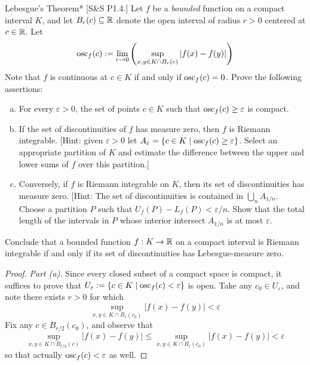 \begin{problem}{Lebesgue's Theorem}*
    [S\&S P1.4.] Let \(f\) be a \emph{bounded} function on a compact interval \(K\), and let \(B_r(c) \subseteq \mathbb{R}\) denote the open interval of radius \(r > 0\) centered at \(c \in \mathbb{R}\). Let 
    \[
        \operatorname{osc}_f(c) := \lim_{r \to 0} \left( \sup_{x, y \in K \cap B_r(c)}|f(x) - f(y)| \right)
    \]
    Note that \(f\) is continuous at \(c \in K\) if and only if \(\operatorname{osc}_f(c) = 0\). Prove the following assertions:
    \begin{enumerate}[(a)]
        \itemsep0em
        \item For every \(\varepsilon > 0\), the set of points \(c \in K\) such that \(\operatorname{osc}_f(c) \geq \varepsilon\) is compact. 
        \item If the set of discontinuities of \(f\) has measure zero, then \(f\) is Riemann integrable. [Hint: given \(\varepsilon > 0\) let \(A_\varepsilon = \{c \in K \mid \operatorname{osc}_f(c) \geq \varepsilon \}\). Select an appropriate partition of \(K\) and estimate the difference between the upper and lower sums of \(f\) over this partition.]
        \item Conversely, if \(f\) is Riemann integrable on \(K\), then its set of discontinuities has measure zero. [Hint: The set of discontinuities is contained in \(\bigcup_n A_{1/n}\). Choose a partition \(P\) such that \(U_f(P) - L_f(P) < \varepsilon / n\). Show that the total length of the intervals in \(P\) whose interior intersect \(A_{1/n}\) is at most \(\varepsilon\). 
    \end{enumerate}

    Conclude that a bounded function \(f : K \to \mathbb{R}\) on a compact interval is Riemann integrable if and only if its set of discontinuities has Lebesgue-measure zero. 
\end{problem}

\begin{proof}
    \emph{Part (a).} Since every closed subset of a compact space is compact, it suffices to prove that \(U_\varepsilon := \{c \in K \mid \operatorname{osc}_f(c) < \varepsilon\}\) is open. Take any \(c_0 \in U_\varepsilon\), and note there exists \(r > 0\) for which 
    \[
        \sup_{x, y \in K \cap B_r(c_0)} |f(x) - f(y)| < \varepsilon 
    \]
    Fix any \(c \in B_{r/2}(c_0)\), and observe that 
    \[
        \sup_{x, y \in K \cap B_{r/2}(c)} |f(x) - f(y)| 
        \leq \sup_{x, y \in K \cap B_r(c_0)} |f(x) - f(y)|
        < \varepsilon
    \]
    so that actually \(\operatorname{osc}_f(c) < \varepsilon\) as well. 
\end{proof}

